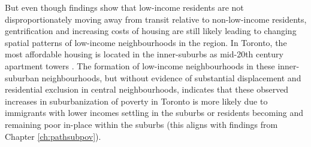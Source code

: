 But even though findings show that low-income residents are not disproportionately moving away from transit relative to non-low-income residents, gentrification and increasing costs of housing are still likely leading to changing spatial patterns of low-income neighbourhoods in the region. In Toronto, the most affordable housing is located in the inner-suburbs as mid-20th century apartment towers \cite{skaburskis_filtering_2014,august_gentrification_2018}. The formation of low-income neighbourhoods in these inner-suburban neighbourhoods, but without evidence of substantial displacement and residential exclusion in central neighbourhoods, indicates that these observed increases in suburbanization of poverty in Toronto is more likely due to immigrants with lower incomes settling in the suburbs or residents becoming and remaining poor in-place within the suburbs (this aligns with findings from Chapter \ref{ch:pathsubpov}).










